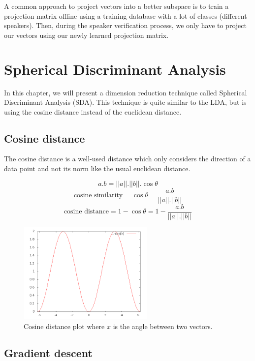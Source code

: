 \documentclass{techrep}
\begin{document}
A common approach to project vectors into a better subspace is to
train a projection matrix offline using a training database with a lot
of classes (different speakers). Then, during the speaker verification process, we only
have to project our vectors using our newly learned projection matrix.

\chapter{Spherical Discriminant Analysis}

In this chapter, we will present a dimension reduction technique
called Spherical Discriminant Analysis (SDA). This technique is quite
similar to the LDA, but is using the cosine distance instead of the
euclidean distance.

\newcommand{\argmax}[1]{\smash{\mathop{{\rm argmax}}\limits_{W}}\, #1}
\newcommand{\argmin}[1]{\smash{\mathop{{\rm argmin}}\limits_{W}}\, #1}

\section{Cosine distance}

The cosine distance is a well-used distance which only considers the
direction of a data point and not its norm like the usual euclidean distance.

$$a.b = ||a||.||b||. \cos{\theta}$$
$$\text{cosine similarity} = \cos{\theta} = \frac{a.b}{||a||.||b||}$$
$$\text{cosine distance} = 1 - \cos{\theta} = 1 - \frac{a.b}{||a||.||b||}$$

\begin{figure}[H]
  \centering
  \includegraphics[width=250px]{cosine_distance}
  \caption{Cosine distance plot where $x$ is the angle between two
    vectors.}
  \label{cosine_distance}
\end{figure}

\section{Gradient descent}
\end{document}
